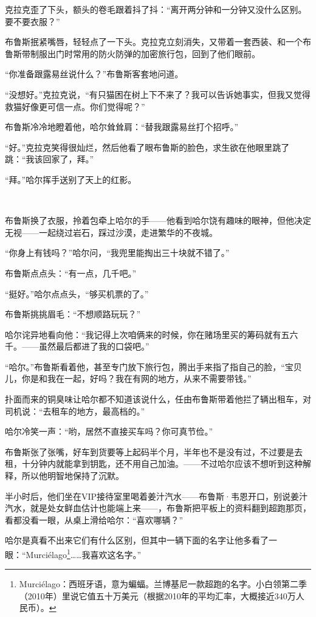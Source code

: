 \documentclass[../main]{subfiles}
\begin{document}
克拉克歪了下头，额头的卷毛跟着抖了抖：“离开两分钟和一分钟又没什么区别。要不要衣服？”

布鲁斯抿紧嘴唇，轻轻点了一下头。克拉克立刻消失，又带着一套西装、和一个布鲁斯带制服出门时常用的防火防弹的加密旅行包，回到了他们眼前。

“你准备跟露易丝说什么？”布鲁斯客套地问道。

“没想好。”克拉克说，“有只猫困在树上下不来了？我可以告诉她事实，但我又觉得救猫好像更可信一点。你们觉得呢？”

布鲁斯冷冷地瞪着他，哈尔耸耸肩：“替我跟露易丝打个招呼。”

“好。”克拉克笑得很灿烂，然后他看了眼布鲁斯的脸色，求生欲在他眼里跳了跳：“我该回家了，拜。”

“拜。”哈尔挥手送别了天上的红影。

~\

布鲁斯换了衣服，拎着包牵上哈尔的手——他看到哈尔饶有趣味的眼神，但他决定无视——一起绕过岩石，踩过沙漠，走进繁华的不夜城。

“你身上有钱吗？”哈尔问，“我兜里能掏出三十块就不错了。”

布鲁斯点点头：“有一点，几千吧。”

“挺好。”哈尔点点头，“够买机票的了。”

布鲁斯挑挑眉毛：“不想顺路玩玩？”

哈尔诧异地看向他：“我记得上次咱俩来的时候，你在赌场里买的筹码就有五六千。——虽然最后都进了我的口袋吧。”

“哈尔。”布鲁斯看着他，甚至专门放下旅行包，腾出手来指了指自己的脸，“宝贝儿，你是和我在一起，好吗？我在有网的地方，从来不需要带钱。”

扑面而来的铜臭味让哈尔都不知道该说什么，任由布鲁斯带着他拦了辆出租车，对司机说：“去租车的地方，最高档的。”

哈尔冷笑一声：“哟，居然不直接买车吗？你可真节俭。”

布鲁斯张了张嘴，好车到货要等上起码半个月，半年也不是没有过，不过要是去租，十分钟内就能拿到钥匙，还不用自己加油。——不过哈尔应该不想听到这种解释，所以他明智地保持了沉默。

半小时后，他们坐在VIP接待室里喝着姜汁汽水——布鲁斯·韦恩开口，别说姜汁汽水，就是处女鲜血估计也能端上来——，布鲁斯把平板上的资料翻到超跑那页，看都没看一眼，从桌上滑给哈尔：“喜欢哪辆？”

哈尔是真看不出来它们有什么区别，但其中一辆下面的名字让他多看了一眼：“Murciélago\footnote[1]{Murciélago：西班牙语，意为蝙蝠。兰博基尼一款超跑的名字。小白领第二季（2010年）里说它值五十万美元（根据2010年的平均汇率，大概接近340万人民币）。}……我喜欢这名字。”
\end{document}
